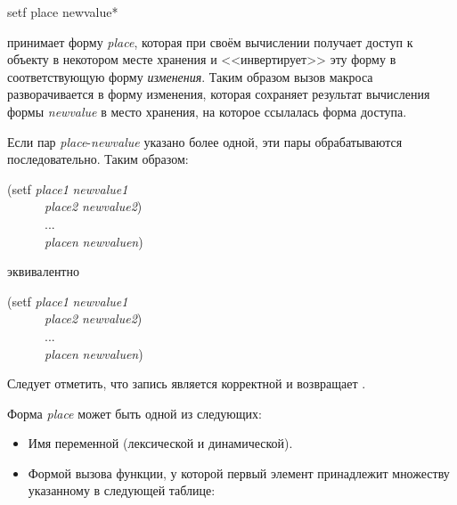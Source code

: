 \begin{defmac}
setf {place newvalue}*

 принимает форму \emph{place}, которая
при своём вычислении получает доступ к объекту в некотором месте хранения и
<<инвертирует>> эту форму в соответствующую форму \emph{изменения}.
Таким образом вызов макроса  разворачивается в форму изменения, 
которая сохраняет результат вычисления формы \emph{newvalue} в место хранения,
на которое ссылалась форма доступа.

Если пар \emph{place}-\emph{newvalue} указано более одной, эти пары
обрабатываются последовательно. Таким образом:
\begin{lisp}
(setf \emph{place1} \emph{newvalue1} \\
~~~~~~\emph{place2} \emph{newvalue2}) \\
~~~~~~... \\
~~~~~~\emph{placen} \emph{newvaluen})
\end{lisp}
эквивалентно
\begin{lisp}
(setf \emph{place1} \emph{newvalue1} \\
~~~~~~\emph{place2} \emph{newvalue2}) \\
~~~~~~... \\
~~~~~~\emph{placen} \emph{newvaluen})
\end{lisp}
Следует отметить, что запись  является корректной и возвращает {\nil}.

Форма \emph{place} может быть одной из следующих:
\begin{itemize}

\item
Имя переменной (лексической и динамической).

\item
Формой вызова функции, у которой первый элемент принадлежит множеству указанному
в следующей таблице:


\end{itemize}
\end{defmac}
